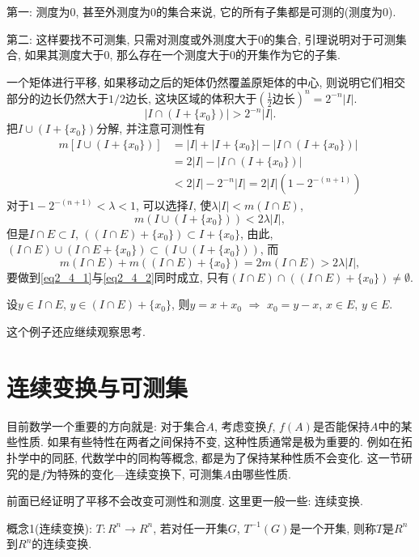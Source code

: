 \documentclass[12pt,a4paper,openany]{book}
\begin{document}
第一: 测度为0, 甚至外测度为0的集合来说, 它的所有子集都是可测的(测度为0).

第二: 这样要找不可测集, 只需对测度或外测度大于0的集合, 引理说明对于可测集合, 如果其测度大于0, 那么存在一个测度大于0的开集作为它的子集.

一个矩体进行平移, 如果移动之后的矩体仍然覆盖原矩体的中心, 则说明它们相交部分的边长仍然大于$1/2$边长, 这块区域的体积大于$(\frac{1}{2}\text{边长})^n = 2^{-n}|I|$.
\[
|I \cap (I + \{x_0\})| > 2^{-n}|I|.
\]
把$I \cup (I + \{x_0\})$分解, 并注意可测性有
\[
\begin{aligned}
m[I \cup (I + \{x_0\})] &= |I| + |I + \{x_0\}| - |I \cap (I + \{x_0\})| \\
&= 2|I| - |I \cap (I + \{x_0\})| \\
&<2|I| - 2^{-n}|I| = 2|I|(1 - 2^{-(n+1)})
\end{aligned}
\]
对于$1 - 2^{-(n+1)} < \lambda < 1$, 可以选择$I$, 使$\lambda|I| < m(I \cap E)$,
\begin{equation}\label{eq2_4_1}
m(I \cup (I + \{x_0\})) < 2\lambda|I|,
\end{equation}
但是$I \cap E \subset I$, $((I \cap E) + \{x_0\}) \subset I + \{x_0\}$, 由此, $(I \cap E) \cup (I \cap E + \{x_0\}) \subset (I \cup (I + \{x_0\}))$, 而
\begin{equation}\label{eq2_4_2}
m(I \cap E) + m((I \cap E) + \{x_0\}) = 2m(I \cap E) > 2\lambda|I|,
\end{equation}
要做到\eqref{eq2_4_1}与\eqref{eq2_4_2}同时成立, 只有$(I \cap E) \cap ((I \cap E) + \{x_0\}) \neq \emptyset$.

设$y \in I \cap E$, $y \in (I \cap E) + \{x_0\}$, 则$y = x+ x_0$ $\Rightarrow$ $x_0 = y - x$, $x \in E$, $y \in E$.

这个例子还应继续观察思考.

\section{连续变换与可测集}
目前数学一个重要的方向就是: 对于集合$A$, 考虑变换$f$, $f(A)$是否能保持$A$中的某些性质. 如果有些特性在两者之间保持不变, 这种性质通常是极为重要的. 例如在拓扑学中的同胚, 代数学中的同构等概念, 都是为了保持某种性质不会变化. 这一节研究的是$f$为特殊的变化---连续变换下, 可测集$A$由哪些性质.

前面已经证明了平移不会改变可测性和测度. 这里更一般一些: 连续变换.

概念1(连续变换): $T: R^n \rightarrow R^n$, 若对任一开集$G$, $T^{-1}(G)$是一个开集, 则称$T$是$R^n$到$R^n$的连续变换.
\end{document}
